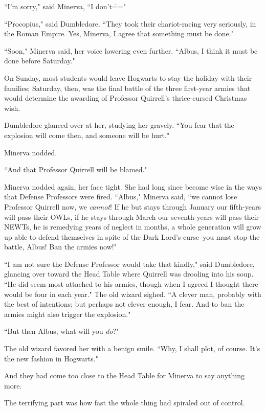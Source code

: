 ``I'm sorry," said Minerva, ``I don't\==="

``Procopius," said Dumbledore. ``They took their chariot-racing very seriously, in the Roman Empire. Yes, Minerva, I agree that something must be done."

``Soon," Minerva said, her voice lowering even further. ``Albus, I think it must be done before Saturday."

On Sunday, most students would leave Hogwarts to stay the holiday with their families; Saturday, then, was the final battle of the three first-year armies that would determine the awarding of Professor Quirrell's thrice-cursed Christmas wish.

Dumbledore glanced over at her, studying her gravely. ``You fear that the explosion will come then, and someone will be hurt."

Minerva nodded.

``And that Professor Quirrell will be blamed."

Minerva nodded again, her face tight. She had long since become wise in the ways that Defense Professors were fired. ``Albus," Minerva said, ``we cannot lose Professor Quirrell now, we \emph{cannot}! If he but stays through January our fifth-years will pass their OWLs, if he stays through March our seventh-years will pass their NEWTs, he is remedying years of neglect in months, a whole generation will grow up able to defend themselves in spite of the Dark Lord's curse\---you must stop the battle, Albus! Ban the armies now!"

``I am not sure the Defense Professor would take that kindly," said Dumbledore, glancing over toward the Head Table where Quirrell was drooling into his soup. ``He did seem most attached to his armies, though when I agreed I thought there would be four in each year." The old wizard sighed. ``A clever man, probably with the best of intentions; but perhaps not clever enough, I fear. And to ban the armies might also trigger the explosion."

``But then Albus, what will you \emph{do}?"

The old wizard favored her with a benign smile. ``Why, I shall plot, of course. It's the new fashion in Hogwarts."

And they had come too close to the Head Table for Minerva to say anything more.

\later

The terrifying part was how fast the whole thing had spiraled out of control.

